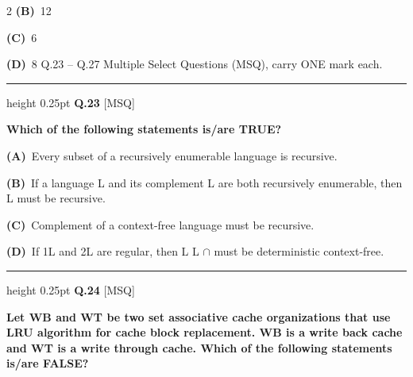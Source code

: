 \documentclass[a4paper,10pt,twoside]{article}
\begin{document}
\begin{multicols}{2}
\textbf{(B)}~12\par\vspace{2pt}\noindent
\textbf{(C)}~6\par\vspace{2pt}\noindent
\textbf{(D)}~8 \newline Q.23 -- Q.27 Multiple Select Questions (MSQ), carry ONE mark each.
\par\vspace{6pt}\hrule height 0.25pt\vspace{6pt}
\noindent\textbf{Q.23} \hfill {\footnotesize\textsf{[MSQ]}}
\par\vspace{2pt}
{\bfseries Which of the following statements is/are TRUE? \par}
\par\vspace{2pt}\noindent
\textbf{(A)}~Every subset of a recursively enumerable language is recursive.\par\vspace{2pt}\noindent
\textbf{(B)}~If a language L and its complement L are both recursively enumerable, then L \newline must be recursive.\par\vspace{2pt}\noindent
\textbf{(C)}~Complement of a context-free language must be recursive.\par\vspace{2pt}\noindent
\textbf{(D)}~If \newline 1L and \newline 2L are regular, then   \newline L \newline L \newline $\cap$ \newline must be deterministic context-free.
\par\vspace{6pt}\hrule height 0.25pt\vspace{6pt}
\noindent\textbf{Q.24} \hfill {\footnotesize\textsf{[MSQ]}}
\par\vspace{2pt}
{\bfseries Let WB and WT be two set associative cache organizations that use LRU algorithm
for cache block replacement. WB is a write back cache and WT is a write through
cache. Which of the following statements is/are FALSE? \par}

\end{multicols}
\end{document}
